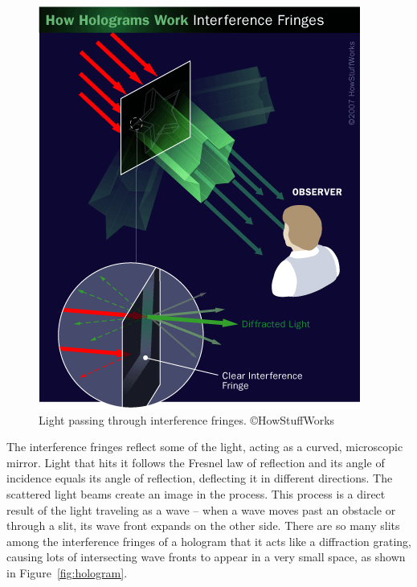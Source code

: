 \begin{figure}[!ht]
\centering
\includegraphics[width=0.9\linewidth,keepaspectratio=true]{figs/hologram-14.png}
\caption{Light passing through interference fringes. ©HowStuffWorks}
\label{fig:fringes}
\end{figure}


The interference fringes reflect some of the light, acting as a curved, microscopic mirror. Light that hits it follows the Fresnel law of reflection  and its angle of incidence equals its angle of reflection, deflecting it in different directions. The scattered light beams create an image in the process.
This process is a direct result of the light traveling as a wave -- when a wave moves past an obstacle or through a slit, its wave front expands on the other side. There are so many slits among the interference fringes of a hologram that it acts like a diffraction grating, causing lots of intersecting wave fronts to appear in a very small space, as shown in Figure~\ref{fig:hologram}.

